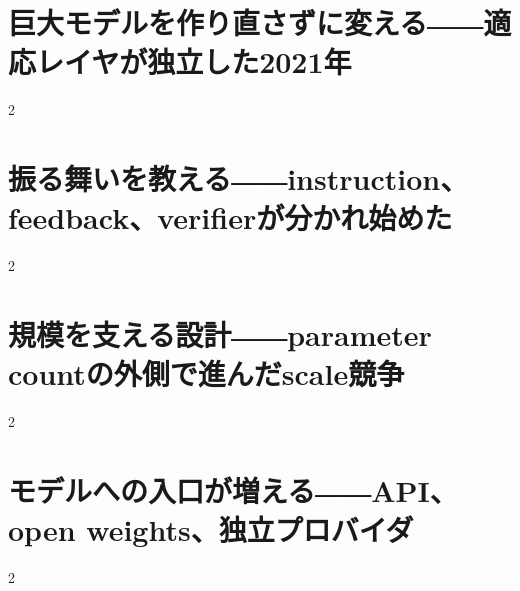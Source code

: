 \documentclass[lualatex,a4paper,11pt]{jlreq}
\begin{document}
\surveycover
\clearpage


\clearpage
\section{巨大モデルを作り直さずに変える――適応レイヤが独立した2021年}
\label{pkg:adaptation-efficient-tuning}

\medskip
\begin{multicols}{2}

\end{multicols}


\Needspace{0.45\textheight}
\bigskip
\section{振る舞いを教える――instruction、feedback、verifierが分かれ始めた}
\label{pkg:instruction-human-feedback}

\medskip
\begin{multicols}{2}

\end{multicols}


\Needspace{0.45\textheight}
\bigskip
\section{規模を支える設計――parameter countの外側で進んだscale競争}
\label{pkg:scale-sparse-systems}

\medskip
\begin{multicols}{2}

\end{multicols}


\Needspace{0.45\textheight}
\bigskip
\section{モデルへの入口が増える――API、open weights、独立プロバイダ}
\label{pkg:access-distribution}

\medskip
\begin{multicols}{2}

\end{multicols}


\Needspace{0.45\textheight}
\bigskip
\end{document}
